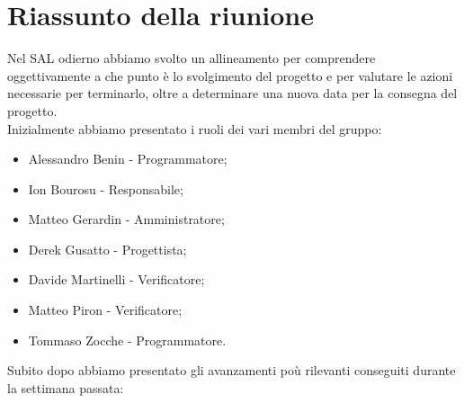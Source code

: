 \section{Riassunto della riunione}
Nel SAL odierno abbiamo svolto un allineamento per comprendere oggettivamente a che punto è lo svolgimento del progetto e per valutare le azioni necessarie per terminarlo, oltre a determinare una nuova data per la consegna del progetto.\\
Inizialmente abbiamo presentato i ruoli dei vari membri del gruppo:
\begin{itemize}
    \item Alessandro Benin - Programmatore;
    \item Ion Bourosu - Responsabile;
    \item Matteo Gerardin - Amministratore;
    \item Derek Gusatto - Progettista;
    \item Davide Martinelli - Verificatore;
    \item Matteo Piron - Verificatore;
    \item Tommaso Zocche - Programmatore.
\end{itemize}
Subito dopo abbiamo presentato gli avanzamenti poù rilevanti conseguiti durante la settimana passata:
